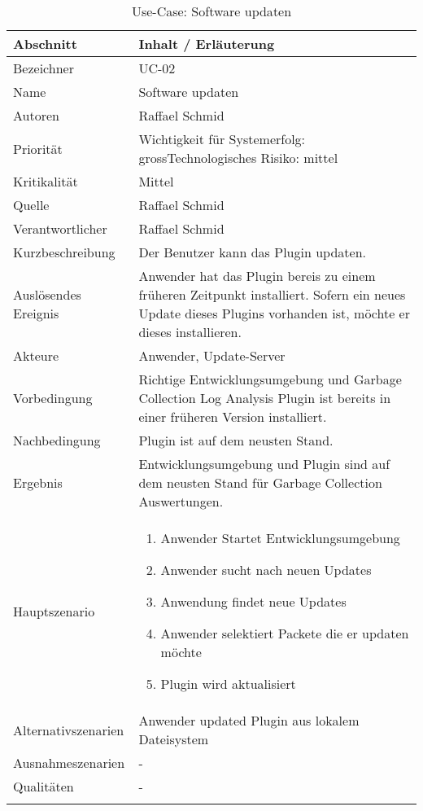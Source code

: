\begin{longtable}{|p{4cm}|p{10.5cm}|}
\hline
   \textbf{Abschnitt} & \textbf{Inhalt / Erläuterung} \\\hline
   Bezeichner & UC-02\\\hline
   Name & Software updaten\\\hline
   Autoren & Raffael Schmid\\\hline
   Priorität & Wichtigkeit für Systemerfolg: gross\newline Technologisches Risiko: mittel\\\hline
   Kritikalität & Mittel\\\hline
   Quelle & Raffael Schmid\\\hline
   Verantwortlicher & Raffael Schmid\\\hline
   Kurzbeschreibung & Der Benutzer kann das Plugin updaten.\\\hline
   Auslösendes Ereignis & Anwender hat das Plugin bereis zu einem früheren Zeitpunkt installiert. Sofern ein neues Update dieses Plugins vorhanden ist, möchte er dieses installieren.\\\hline
   Akteure & Anwender, Update-Server\\\hline
   Vorbedingung & Richtige Entwicklungsumgebung und Garbage Collection Log Analysis Plugin ist bereits in einer früheren Version installiert.\\\hline
   Nachbedingung & Plugin ist auf dem neusten Stand.\\\hline
   Ergebnis & Entwicklungsumgebung und Plugin sind auf dem neusten Stand für Garbage Collection Auswertungen.\\\hline
   Hauptszenario & 
	\begin{enumerate}
		\item Anwender Startet Entwicklungsumgebung
		\item Anwender sucht nach neuen Updates
		\item Anwendung findet neue Updates
		\item Anwender selektiert Packete die er updaten möchte
		\item Plugin wird aktualisiert
	\end{enumerate}
	\\\hline
   Alternativszenarien & Anwender updated Plugin aus lokalem Dateisystem\\\hline
   Ausnahmeszenarien & -\\\hline
   Qualitäten & -\\\hline
\caption{Use-Case: Software updaten}
\end{longtable}

